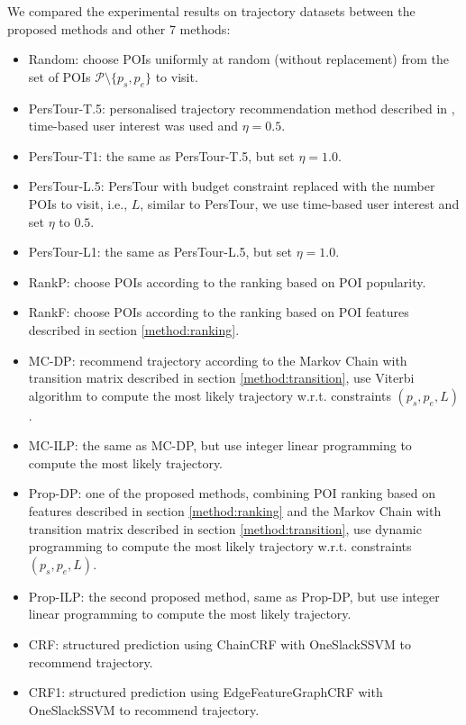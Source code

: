 We compared the experimental results on trajectory datasets between the proposed methods and other 7 methods:
\begin{itemize}
\item Random: choose POIs uniformly at random (without replacement) from the set of POIs $\mathcal{P} \setminus \{p_s, p_e \}$ to visit.
\item PersTour-T.5\cite{ijcai15}: personalised trajectory recommendation method described in \cite{ijcai15}, 
      time-based user interest was used and $\eta = 0.5$.
\item PersTour-T1\cite{ijcai15}: the same as PersTour-T.5, but set $\eta=1.0$.
\item PersTour-L.5: PersTour\cite{ijcai15} with budget constraint replaced with the number POIs to visit, i.e., $L$,
      similar to PersTour, we use time-based user interest and set $\eta$ to $0.5$.
\item PersTour-L1: the same as PersTour-L.5, but set $\eta=1.0$.
\item RankP: choose POIs according to the ranking based on POI popularity.
\item RankF: choose POIs according to the ranking based on POI features described in section \ref{method:ranking}.
\item MC-DP: recommend trajectory according to the Markov Chain with transition matrix described in section \ref{method:transition},
      use Viterbi algorithm to compute the most likely trajectory w.r.t. constraints $(p_s, p_e, L)$.
\item MC-ILP: the same as MC-DP, but use integer linear programming to compute the most likely trajectory.
\item Prop-DP: one of the proposed methods, combining POI ranking based on features 
      described in section \ref{method:ranking} and the Markov Chain with transition matrix described in section \ref{method:transition},
      use dynamic programming to compute the most likely trajectory w.r.t. constraints $(p_s, p_e, L)$.
\item Prop-ILP: the second proposed method, same as Prop-DP,
      but use integer linear programming to compute the most likely trajectory.
\item CRF: structured prediction using ChainCRF with OneSlackSSVM to recommend trajectory.
\item CRF1: structured prediction using EdgeFeatureGraphCRF with OneSlackSSVM to recommend trajectory.
\end{itemize}

